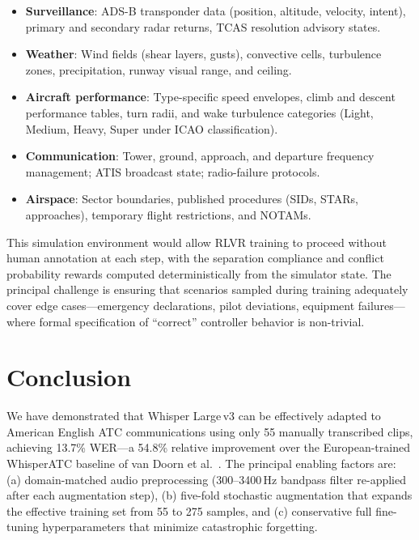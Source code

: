 \documentclass[11pt,a4paper]{article}
\begin{document}
\begin{itemize}[noitemsep]
  \item \textbf{Surveillance}: ADS-B transponder data (position, altitude,
        velocity, intent), primary and secondary radar returns, TCAS resolution
        advisory states.
  \item \textbf{Weather}: Wind fields (shear layers, gusts), convective cells,
        turbulence zones, precipitation, runway visual range, and ceiling.
  \item \textbf{Aircraft performance}: Type-specific speed envelopes,
        climb and descent performance tables, turn radii, and wake turbulence
        categories (Light, Medium, Heavy, Super under ICAO classification).
  \item \textbf{Communication}: Tower, ground, approach, and departure
        frequency management; ATIS broadcast state; radio-failure protocols.
  \item \textbf{Airspace}: Sector boundaries, published procedures (SIDs,
        STARs, approaches), temporary flight restrictions, and NOTAMs.
\end{itemize}

This simulation environment would allow RLVR training to proceed without
human annotation at each step, with the separation compliance and conflict
probability rewards computed deterministically from the simulator state.
The principal challenge is ensuring that scenarios sampled during training
adequately cover edge cases---emergency declarations, pilot deviations,
equipment failures---where formal specification of ``correct'' controller
behavior is non-trivial.

\section{Conclusion}

We have demonstrated that Whisper Large\,v3 can be effectively adapted to
American English ATC communications using only 55 manually transcribed clips,
achieving 13.7\% WER---a 54.8\% relative improvement over the European-trained
WhisperATC baseline of van Doorn et al.~\cite{vandoorn2024whisperatc}. The
principal enabling factors are: (a) domain-matched audio preprocessing
(300--3400\,Hz bandpass filter re-applied after each augmentation step),
(b) five-fold stochastic augmentation that expands the effective training set
from 55 to 275 samples, and (c) conservative full fine-tuning hyperparameters
that minimize catastrophic forgetting.
\end{document}
